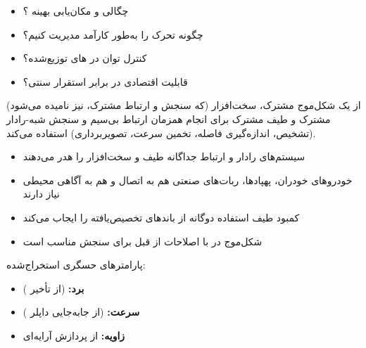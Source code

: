 
\begin{itemize}
\tightlist
\item
  چگالی و مکان‌یابی بهینه ؟
\item
  چگونه تحرک را به‌طور کارآمد مدیریت کنیم؟
\item
  کنترل توان در های توزیع‌شده؟
\item
  قابلیت اقتصادی در برابر استقرار سنتی؟
\end{itemize}



\CNchained{}

\CNchained{}

 (که سنجش و ارتباط مشترک،  نیز نامیده می‌شود) از یک شکل‌موج مشترک، سخت‌افزار مشترک و طیف مشترک برای انجام همزمان ارتباط بی‌سیم و سنجش شبه-رادار (تشخیص، اندازه‌گیری فاصله، تخمین سرعت، تصویربرداری) استفاده می‌کند.


\begin{itemize}
\tightlist
\item
  سیستم‌های رادار و ارتباط جداگانه طیف و سخت‌افزار را هدر می‌دهند
\item
  خودروهای خودران، پهپادها، ربات‌های صنعتی هم به اتصال و هم به آگاهی محیطی نیاز دارند
\item
  کمبود طیف استفاده دوگانه از باندهای تخصیص‌یافته را ایجاب می‌کند
\item
  شکل‌موج  در  با اصلاحات از قبل برای سنجش مناسب است
\end{itemize}




پارامترهای حسگری استخراج‌شده:

\begin{itemize}
\tightlist
\item
  \textbf{برد:}  (از تأخیر \lr{$\tau$})
\item
  \textbf{سرعت:}  (از جابه‌جایی داپلر )
\item
  \textbf{زاویه:} \lr{$\theta$} از پردازش آرایه‌ای 
\end{itemize}

